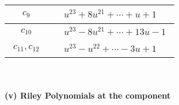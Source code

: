 \documentclass[1p]{elsarticle_modified}
\theoremstyle{definition}
\begin{document}
\begin{tabular}{m{50pt}|m{274pt}}
\hline $$\begin{aligned}c_{9}\end{aligned}$$&$\begin{aligned}
&u^{23}+8 u^{21}+\cdots+u+1
\end{aligned}$\\
\hline $$\begin{aligned}c_{10}\end{aligned}$$&$\begin{aligned}
&u^{23}-8 u^{21}+\cdots+13 u-1
\end{aligned}$\\
\hline $$\begin{aligned}c_{11},c_{12}\end{aligned}$$&$\begin{aligned}
&u^{23}- u^{22}+\cdots-3 u+1
\end{aligned}$\\
\hline
\end{tabular}\\~\\
\newpage\renewcommand{\arraystretch}{1}
\flushleft \textbf{(v) Riley Polynomials at the component}\newline \\
\end{document}
